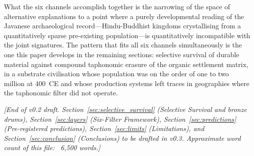 \documentclass[12pt,a4paper]{article}
\begin{document}
What the six channels accomplish together is the narrowing of the space of alternative explanations to a point where a purely developmental reading of the Javanese archaeological record---Hindu-Buddhist kingdoms crystallising from a quantitatively sparse pre-existing population---is quantitatively incompatible with the joint signatures. The pattern that fits all six channels simultaneously is the one this paper develops in the remaining sections: selective survival of durable material against compound taphonomic erasure of the organic settlement matrix, in a substrate civilisation whose population was on the order of one to two million at 400~CE and whose production systems left traces in geographies where the taphonomic filter did not operate.


\vspace{1em}
\noindent\textit{[End of v0.2 draft. Section~\ref{sec:selective_survival} (Selective Survival and bronze drums), Section~\ref{sec:layers} (Six-Filter Framework), Section~\ref{sec:predictions} (Pre-registered predictions), Section~\ref{sec:limits} (Limitations), and Section~\ref{sec:conclusion} (Conclusions) to be drafted in v0.3. Approximate word count of this file: ~6{,}500 words.]}



\end{document}
